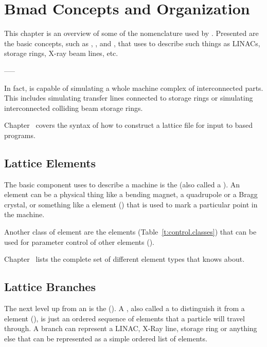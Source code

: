 \chapter{Bmad Concepts and Organization}
\label{c:lat.concepts}

This chapter is an overview of some of the nomenclature used
by \bmad. Presented are the basic concepts, such as ,
, and , that \bmad uses to describe such things
as LINACs, storage rings, X-ray beam lines, etc.  

----- \needswork

In fact, \bmad is
capable of simulating a whole machine complex of interconnected parts.
This includes simulating transfer lines connected to storage rings or 
simulating interconnected colliding beam storage rings.

Chapter~ covers the syntax of how to construct a
lattice file for input to \bmad based programs.

\section{Lattice Elements}
\label{s:element.def}

The basic component \bmad uses to describe a machine is the
 (also called a ).  An element can be
a physical thing like a bending magnet, a quadrupole or a Bragg
crystal, or something like a  element ()
that is used to mark a particular point in the machine.

Another class of element are the  elements
(Table~\ref{t:control.classes}) that can be used for parameter control
of other elements ().

Chapter~ lists the complete set of different element
types that \bmad knows about.

\section{Lattice Branches}
\label{s:branch.def}

The next level up from an  is the 
().  A , also called a  to distinguish it from a  element
(), is just an ordered sequence of elements that a
particle will travel through. A branch can represent a LINAC, X-Ray
line, storage ring or anything else that can be represented as a
simple ordered list of elements. 

